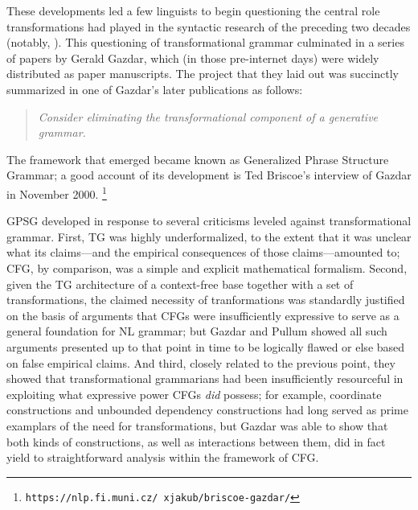 \documentclass[output=paper]{langsci/langscibook}
\begin{document}
These developments led a few linguists to begin questioning the central role transformations had played in the syntactic research of the preceding two decades (notably, \citet{Bresnan78a}).  This questioning of transformational grammar culminated in a series of papers by Gerald Gazdar, which (in those pre-internet days) were widely distributed as paper manuscripts.  The project that they laid out was succinctly summarized in one of Gazdar's later publications \citep{Gazdar81} as follows:

\begin{quote}
{\em Consider eliminating the transformational component of a generative grammar.}
\end{quote}

\noindent
The framework that emerged became known as Generalized Phrase Structure Grammar; a good account of its development is Ted Briscoe's interview of Gazdar in November 2000. \footnote{\tt https://nlp.fi.muni.cz/~xjakub/briscoe-gazdar/}

GPSG developed in response to several criticisms leveled against transformational grammar. First, TG was highly underformalized, to the extent that it was unclear what its claims---and the empirical consequences of those claims---amounted to; CFG, by comparison, was a simple and explicit mathematical formalism. Second, given the TG architecture of a context-free base together with a set of transformations, the claimed necessity of tranformations was standardly justified on the basis of arguments that CFGs were insufficiently expressive to serve as a general foundation for NL grammar; but Gazdar and Pullum showed all such arguments presented up to that point in time to be logically flawed or else based on false empirical claims. And third, closely related to the previous point, they showed that transformational grammarians had been insufficiently resourceful in exploiting what expressive power CFGs {\em did} possess; for example, coordinate constructions and unbounded dependency constructions had long served as prime examplars of the need for transformations, but Gazdar was able to show that both kinds of constructions, as well as interactions between them, did in fact yield to straightforward analysis within the framework of CFG.
 
\end{document}
